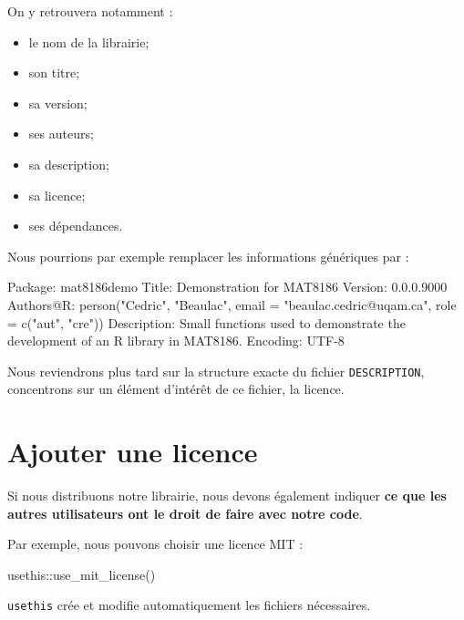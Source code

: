 \documentclass[
  letterpaper,
  DIV=11,
  numbers=noendperiod]{scrreprt}
\newenvironment{Shaded}{\begin{snugshade}}{\end{snugshade}}
\newcommand{\FunctionTok}[1]{\textcolor[rgb]{0.28,0.35,0.67}{#1}}
\newcommand{\NormalTok}[1]{\textcolor[rgb]{0.00,0.23,0.31}{#1}}
\newcommand{\SpecialCharTok}[1]{\textcolor[rgb]{0.37,0.37,0.37}{#1}}
\providecommand{\tightlist}{%
  \setlength{\itemsep}{0pt}\setlength{\parskip}{0pt}}\usepackage{longtable,booktabs,array}
\begin{document}
On y retrouvera notamment :

\begin{itemize}
\tightlist
\item
  le nom de la librairie;
\item
  son titre;
\item
  sa version;
\item
  ses auteurs;
\item
  sa description;
\item
  sa licence;
\item
  ses dépendances.
\end{itemize}

Nous pourrions par exemple remplacer les informations génériques par :

\begin{Shaded}
\begin{Highlighting}[]
\NormalTok{Package: mat8186demo}
\NormalTok{Title: Demonstration for MAT8186}
\NormalTok{Version: 0.0.0.9000}
\NormalTok{Authors@R:}
\NormalTok{    person("Cedric", "Beaulac",}
\NormalTok{           email = "beaulac.cedric@uqam.ca",}
\NormalTok{           role = c("aut", "cre"))}
\NormalTok{Description: Small functions used to demonstrate the development}
\NormalTok{    of an R library in MAT8186.}
\NormalTok{Encoding: UTF{-}8}
\end{Highlighting}
\end{Shaded}

Nous reviendrons plus tard sur la structure exacte du fichier
\texttt{DESCRIPTION}, concentrons sur un élément d'intérêt de ce
fichier, la licence.

\section{Ajouter une licence}\label{ajouter-une-licence}

Si nous distribuons notre librairie, nous devons également indiquer
\textbf{ce que les autres utilisateurs ont le droit de faire avec notre
code}.

Par exemple, nous pouvons choisir une licence MIT :

\begin{Shaded}
\begin{Highlighting}[]
\NormalTok{usethis}\SpecialCharTok{::}\FunctionTok{use\_mit\_license}\NormalTok{()}
\end{Highlighting}
\end{Shaded}

\texttt{usethis} crée et modifie automatiquement les fichiers
nécessaires.
\end{document}
